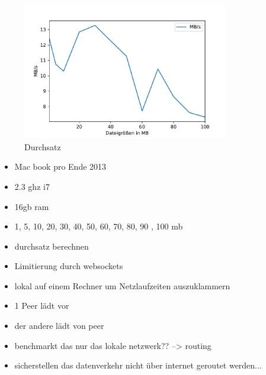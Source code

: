 \begin{figure}[!h]
	\centering
	\includegraphics[width=0.8\textwidth]{figures/durchsatz_file_size}
	\caption[A Figure Short-Title]{Durchsatz}
	\label{fig:durchsatz_file_size}
\end{figure}


\begin{itemize}
	\item Mac book pro Ende 2013
	\item 2.3 ghz i7
	\item 16gb ram
	\item 1, 5, 10, 20, 30, 40, 50, 60, 70, 80, 90 , 100 mb
	\item durchsatz berechnen
	\item Limitierung durch websockets
	\item lokal auf einem Rechner um Netzlaufzeiten auszuklammern
	\item 1 Peer lädt vor
	\item der andere lädt von peer
	\item benchmarkt das nur das lokale netzwerk?? --> routing
	\item sicherstellen das datenverkehr nicht über internet geroutet werden...
\end{itemize}

